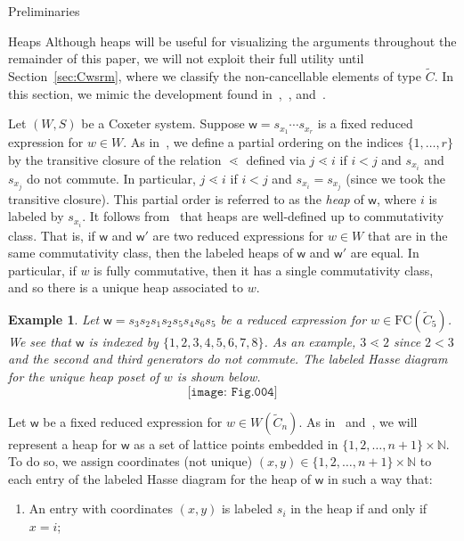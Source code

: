 \documentclass[12pt]{amsart}
\newtheorem{ex}[thm]{Example}
\newcommand{\C}{\widetilde{C}}
\renewcommand{\(}{\left(}
\renewcommand{\)}{\right)}
\newcommand{\w}{\mathsf{w}}
\newcommand{\FC}{\mathrm{FC}}
\begin{document}
\begin{section}{Preliminaries}
\begin{subsection}{Heaps}
Although heaps will be useful for visualizing the arguments throughout the remainder of this paper, we will not exploit their full utility until Section~\ref{sec:Cwsrm}, where we classify the non-cancellable elements of type $\C$.  In this section, we mimic the development found in~\cite{Billey.S;Jones.B:A},~\cite{Billey.S;Warrington.G:A}, and~\cite{Stembridge.J:B}.  

Let $(W,S)$ be a Coxeter system.  Suppose $\w = s_{x_1} \cdots s_{x_r}$ is a fixed reduced expression for $w \in W$.  As in~\cite{Stembridge.J:B}, we define a partial ordering on the indices $\{1, \dots, r\}$ by the transitive closure of the relation $\lessdot$ defined via $j \lessdot i$ if $i < j$ and $s_{x_i}$ and $s_{x_j}$ do not commute.  In particular, $j \lessdot i$ if $i < j$ and $s_{x_i} = s_{x_j}$ (since we took the transitive closure).  This partial order is referred to as the \emph{heap} of $\w$, where $i$ is labeled by $s_{x_i}$.  It follows from~\cite[Proposition 2.2]{Stembridge.J:B} that heaps are well-defined up to commutativity class.  That is, if $\w$ and $\w'$ are two reduced expressions for $w \in W$ that are in the same commutativity class, then the labeled heaps of $\w$ and $\w'$ are equal.  In particular, if $w$ is fully commutative, then it has a single commutativity class, and so there is a unique heap associated to $w$.

\begin{ex}\label{ex:first.heap}
Let $\w = s_3 s_2 s_1 s_2 s_5s_{4}s_{6}s_{5}$ be a reduced expression for $w \in \FC(\C_{5})$.  We see that $\w$ is indexed by $\{1, 2, 3, 4, 5, 6, 7, 8\}$.  As an example, $3 \lessdot 2$ since $2 < 3$ and the second and third generators do not commute.  The labeled Hasse diagram for the unique heap poset of $w$ is shown below.
\[
\texttt{[image: Fig.004]}
\]
\end{ex}

Let $\w$ be a fixed reduced expression for $w \in W(\C_{n})$.  As in~\cite{Billey.S;Jones.B:A} and~\cite{Billey.S;Warrington.G:A}, we will represent a heap for $\w$ as a set of lattice points embedded in $\{1,2,\ldots,n+1\} \times \mathbb{N}$.  To do so, we assign coordinates (not unique) $(x,y) \in \{1,2,\ldots, n+1\} \times \mathbb{N}$ to each entry of the labeled Hasse diagram for the heap of $\w$ in such a way that:
\begin{enumerate}
\item An entry with coordinates $(x,y)$ is labeled $s_i$ in the heap if and only if $x = i$; 


\end{enumerate}
\end{subsection}
\end{section}
\end{document}
